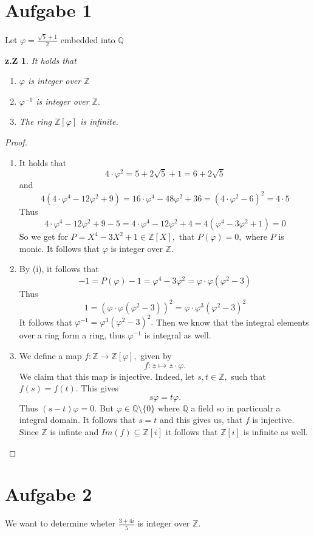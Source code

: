 \documentclass[10pt,a4paper]{article}
\date{\today}
\newtheorem*{zz*}{z.Z}
\newcommand{\QQ}{\mathbb{Q}}
\newcommand{\ZZ}{\mathbb{Z}}
\newcommand{\frnr}{\frac{3+4i}{5}}
\begin{document}
	
	\section*{Aufgabe 1}
	Let $\varphi = \frac{\sqrt{5} + 1}{2}$ embedded into $\QQ$
	\begin{zz*}
		It holds that
		\begin{enumerate}[label = (\roman*)]
			\item $\varphi$ is integer over $\ZZ$
			\item $\varphi^{-1}$ is integer over $\ZZ.$
			\item The ring $\ZZ[\varphi]$ is infinite.
		\end{enumerate}
	\end{zz*}
	\begin{proof}
		\begin{enumerate}[label = (\roman*)]
			\item It holds that
			\[4\cdot \varphi^2 = 5+2\sqrt{5} + 1 = 6+2\sqrt{5}\]
			and
			\[4(4\cdot \varphi^4 - 12\varphi^2 + 9) = 16\cdot \varphi^4 - 48\varphi^2 + 36 = (4\cdot \varphi^2-6)^2 = 4\cdot5\]
			Thus
			\[4\cdot \varphi^4 - 12\varphi^2 + 9 - 5 = 4\cdot \varphi^4-12\varphi^2 +4 = 4(\varphi^4-3\varphi^2+1) = 0\]
			So we get for $P = X^4 - 3X^2 + 1\in \ZZ[X],$ that $P(\varphi) = 0,$ where $P$ is monic. It follows that $\varphi$ is integer over $\ZZ.$
			\item By (i), it follows that
			\[-1 = P(\varphi) - 1= \varphi^4 - 3\varphi^2 = \varphi\cdot \varphi(\varphi^2 - 3)\]
			Thus
			\[1 = (\varphi\cdot \varphi(\varphi^2 - 3))^2 = \varphi\cdot \varphi^3(\varphi^2 - 3)^2\]
			It follows that $\varphi^{-1} = \varphi^3(\varphi^2-3)^2.$ Then we know that the integral elements over a ring form a ring, thus $\varphi^{-1}$ is integral as well.
			\item We define a map $f: \ZZ\to \ZZ[\varphi],$ given by
			\[f: z\mapsto z\cdot \varphi.\]
			We claim that this map is injective. Indeed, let $s,t\in \ZZ,$ such that $f(s) = f(t).$ This gives
			\[s\varphi = t\varphi.\]
			Thus $(s-t)\varphi = 0.$ But $\varphi\in \QQ\setminus\{0\}$ where $\QQ$ a field so in particualr a integral domain. It follows that $s = t$ and this gives us, that $f$ is injective. Since $\ZZ$ is infinte and $Im(f)\subseteq\ZZ[i]$ it follows that $\ZZ[i]$ is infinite as well.
		\end{enumerate}
	\end{proof}
	\pagebreak
	
	\section*{Aufgabe 2}
	We want to determine wheter $\frnr$ is integer over $\ZZ.$
	\bigskip
	
\end{document}
